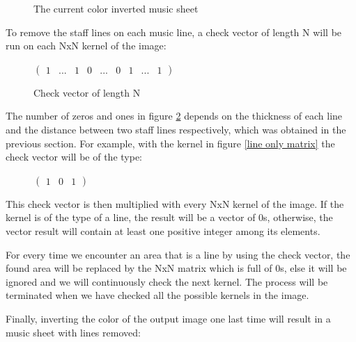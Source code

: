 \documentclass[final]{cvpr}
\begin{document}
\begin{figure}[h]
    \caption{The current color inverted music sheet}
    \label{}
\end{figure}
 
To remove the staff lines on each music line, a check vector of length N will be run 
on each NxN kernel of the image:

\begin{figure}[ht]
    \centering
$
\begin{pmatrix}
	1 & ... & 1 & 0 & ... & 0 & 1 & ... & 1
\end{pmatrix}
$\\
\caption{Check vector of length N}
\label{check vector}
\end{figure}

The number of zeros and ones in figure \ref{check vector} depends on
the thickness of each line and the distance between two staff lines
respectively, which was obtained in the previous section.  For example, with the
kernel in figure \ref{line only matrix} the check vector will be of the type:

\begin{figure}[h!]
    \centering
    $
    \begin{pmatrix}
       1 & 0 & 1 
    \end{pmatrix}
    $\\
\end{figure}

 This check vector is then multiplied with every NxN kernel of the image. If the
 kernel is of the type of a line, the result will be a vector of 0s, otherwise,
 the vector result will contain at least one positive integer among its
 elements.

 For every time we encounter an area that is a line by using the check vector,
 the found area will be replaced by the NxN matrix which is full of 0s, else it
 will be ignored and we will continuously check the next kernel. The process
 will be terminated when we have checked all the possible kernels in the
 image.

Finally, inverting the color of the output image one last time will result in a
music sheet with lines removed:
\end{document}
